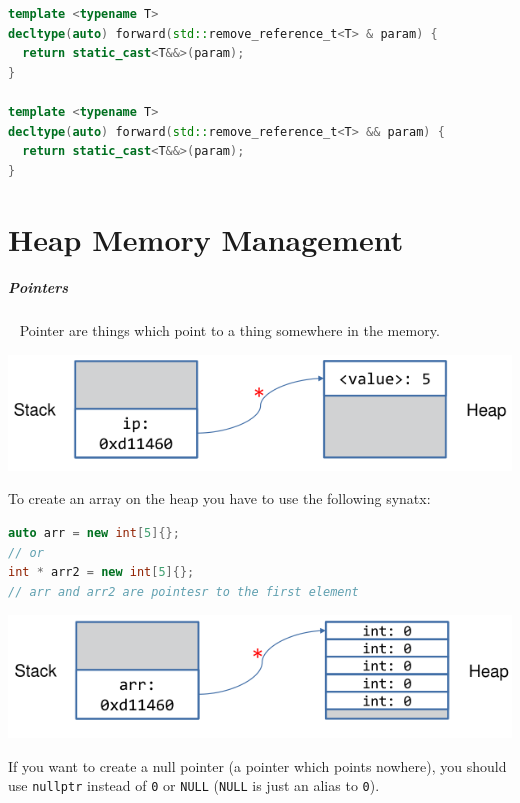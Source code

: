 \documentclass[11pt,twoside,landscape]{article}
\begin{document}
\begin{multicols}{2}
\begin{lstlisting}[language=c++,label=lst:std-forward-for-lvalue-references,caption={Example implementation for std::forward},captionpos=b,numbers=none]
template <typename T>
decltype(auto) forward(std::remove_reference_t<T> & param) {
  return static_cast<T&&>(param);
}

template <typename T>
decltype(auto) forward(std::remove_reference_t<T> && param) {
  return static_cast<T&&>(param);
}
\end{lstlisting}

\section{Heap Memory Management}
\label{sec:org0b69890}
\subparagraph{Pointers} \
\label{sec:orgc3c170f}
Pointer are things which point to a thing somewhere in the memory.


{
\begin{center}
\includegraphics[width=.9\linewidth]{img/pointer_to_heap.png}
\end{center}
\label{fig:point-from-stack-to-heap}
}
To create an array on the heap you have to use the following synatx:
\begin{lstlisting}[language=c++,numbers=none]
auto arr = new int[5]{};
// or
int * arr2 = new int[5]{};
// arr and arr2 are pointesr to the first element
\end{lstlisting}

{
\begin{center}
\includegraphics[width=.9\linewidth]{img/pointer_to_array.png}
\end{center}
\label{fig:pointer-to-array}
}

If you want to create a null pointer (a pointer which points nowhere), you should use \texttt{nullptr} instead of \texttt{0} or \texttt{NULL} (\texttt{NULL} is just an alias to \texttt{0}).


\end{multicols}
\end{document}
